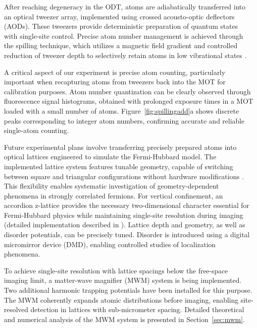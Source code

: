 After reaching degeneracy in the ODT, atoms are adiabatically transferred into an optical tweezer array, implemented using crossed acousto-optic deflectors (AODs). These tweezers provide deterministic preparation of quantum states with single-site control. Precise atom number management is achieved through the spilling technique, which utilizes a magnetic field gradient and controlled reduction of tweezer depth to selectively retain atoms in low vibrational states \cite{culemann_construction_2024, huang_construction_2024}.

A critical aspect of our experiment is precise atom counting, particularly important when recapturing atoms from tweezers back into the MOT for calibration purposes. Atom number quantization can be clearly observed through fluorescence signal histograms, obtained with prolonged exposure times in a MOT loaded with a small number of atoms. Figure~\ref{fig:spillingadd}a shows discrete peaks corresponding to integer atom numbers, confirming accurate and reliable single-atom counting.

Future experimental plans involve transferring precisely prepared atoms into optical lattices engineered to simulate the Fermi-Hubbard model. The implemented lattice system features tunable geometry, capable of switching between square and triangular configurations without hardware modifications \cite{dux_optical_2023}. This flexibility enables systematic investigation of geometry-dependent phenomena in strongly correlated fermions. For vertical confinement, an accordion z-lattice provides the necessary two-dimensional character essential for Fermi-Hubbard physics while maintaining single-site resolution during imaging (detailed implementation described in \cite{huang_construction_2024}). Lattice depth and geometry, as well as disorder potentials, can be precisely tuned. Disorder is introduced using a digital micromirror device (DMD), enabling controlled studies of localization phenomena. 

To achieve single-site resolution with lattice spacings below the free-space imaging limit, a matter-wave magnifier (MWM) system is being implemented. Two additional harmonic trapping potentials have been installed for this purpose. The MWM coherently expands atomic distributions before imaging, enabling site-resolved detection in lattices with sub-micrometer spacing. Detailed theoretical and numerical analysis of the MWM system is presented in Section~\ref{sec:mwm}.

